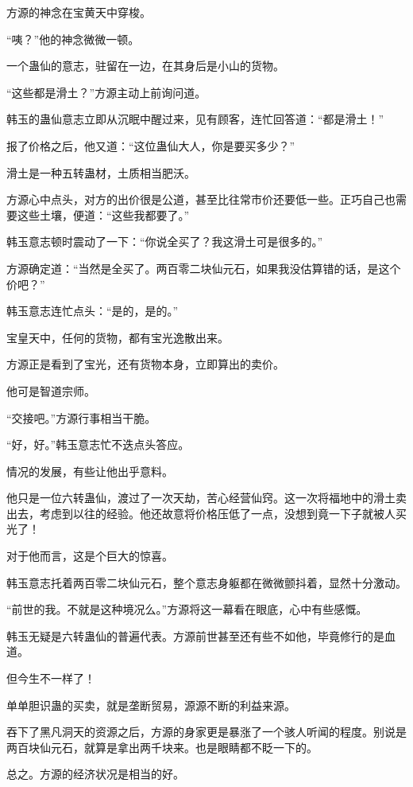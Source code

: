 
\begin{this_body}

方源的神念在宝黄天中穿梭。

“咦？”他的神念微微一顿。

一个蛊仙的意志，驻留在一边，在其身后是小山的货物。

“这些都是滑土？”方源主动上前询问道。

韩玉的蛊仙意志立即从沉眠中醒过来，见有顾客，连忙回答道：“都是滑土！”

报了价格之后，他又道：“这位蛊仙大人，你是要买多少？”

滑土是一种五转蛊材，土质相当肥沃。

方源心中点头，对方的出价很是公道，甚至比往常市价还要低一些。正巧自己也需要这些土壤，便道：“这些我都要了。”

韩玉意志顿时震动了一下：“你说全买了？我这滑土可是很多的。”

方源确定道：“当然是全买了。两百零二块仙元石，如果我没估算错的话，是这个价吧？”

韩玉意志连忙点头：“是的，是的。”

宝皇天中，任何的货物，都有宝光逸散出来。

方源正是看到了宝光，还有货物本身，立即算出的卖价。

他可是智道宗师。

“交接吧。”方源行事相当干脆。

“好，好。”韩玉意志忙不迭点头答应。

情况的发展，有些让他出乎意料。

他只是一位六转蛊仙，渡过了一次天劫，苦心经营仙窍。这一次将福地中的滑土卖出去，考虑到以往的经验。他还故意将价格压低了一点，没想到竟一下子就被人买光了！

对于他而言，这是个巨大的惊喜。

韩玉意志托着两百零二块仙元石，整个意志身躯都在微微颤抖着，显然十分激动。

“前世的我。不就是这种境况么。”方源将这一幕看在眼底，心中有些感慨。

韩玉无疑是六转蛊仙的普遍代表。方源前世甚至还有些不如他，毕竟修行的是血道。

但今生不一样了！

单单胆识蛊的买卖，就是垄断贸易，源源不断的利益来源。

吞下了黑凡洞天的资源之后，方源的身家更是暴涨了一个骇人听闻的程度。别说是两百块仙元石，就算是拿出两千块来。也是眼睛都不眨一下的。

总之。方源的经济状况是相当的好。


\end{this_body}
